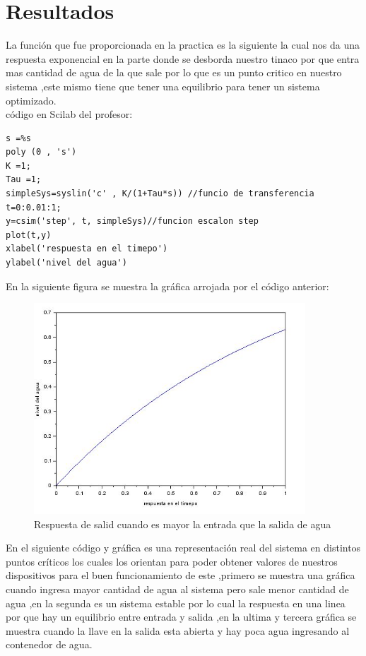 \documentclass[12pt,a4paper]{report}
\begin{document}
\chapter{Resultados}
La función que fue proporcionada en la practica es la siguiente la cual nos da una respuesta exponencial en la parte donde se desborda nuestro tinaco por que entra mas cantidad de agua de la que sale por lo que es un punto critico en nuestro sistema ,este mismo tiene que tener una equilibrio para tener un sistema optimizado.\\

código en Scilab del profesor:
\begin{lstlisting}[frame=single]
s =%s
poly (0 , 's')
K =1;
Tau =1;
simpleSys=syslin('c' , K/(1+Tau*s)) //funcio de transferencia
t=0:0.01:1;
y=csim('step', t, simpleSys)//funcion escalon step
plot(t,y)
xlabel('respuesta en el timepo')
ylabel('nivel del agua')

\end{lstlisting}
En la siguiente figura se muestra la gráfica arrojada por el código anterior:\\
\begin{figure}[h!]
  \centering
    \includegraphics[width=4.0in]{IMAGENPROFE}
  \caption{Respuesta de salid cuando es mayor la entrada que la salida de agua}
\end{figure}
En el siguiente código y gráfica es una representación real del sistema en distintos puntos críticos los cuales los orientan para poder obtener valores de nuestros dispositivos  para el buen funcionamiento de este ,primero se muestra una gráfica cuando ingresa mayor cantidad de agua al sistema pero sale menor cantidad de agua ,en la segunda es un sistema estable por lo cual la respuesta en una linea por que hay un equilibrio entre entrada y salida ,en la ultima y tercera gráfica se muestra cuando la llave en la salida esta abierta y hay poca agua ingresando al contenedor de agua.
\end{document}
